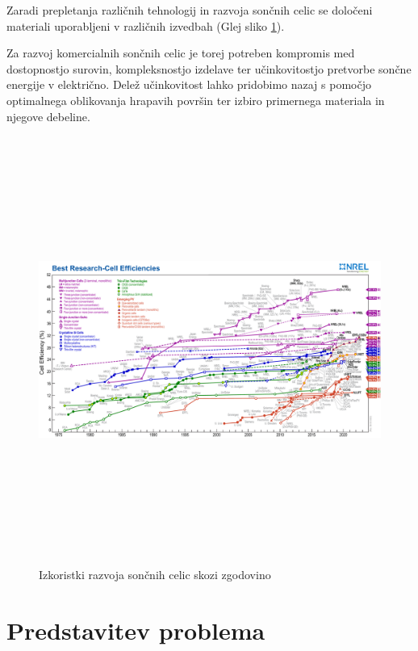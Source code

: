 \documentclass[a4paper,twoside,openright,12pt,slovene]{book}
\begin{document}
Zaradi prepletanja različnih tehnologij in razvoja sončnih celic se določeni materiali uporabljeni v različnih izvedbah (Glej sliko \ref{fig:izkoristki}).

Za razvoj komercialnih sončnih celic je torej potreben kompromis med dostopnostjo surovin, kompleksnostjo izdelave ter učinkovitostjo pretvorbe sončne energije v električno. Delež učinkovitost lahko pridobimo nazaj s pomočjo optimalnega oblikovanja hrapavih površin ter izbiro primernega materiala in njegove debeline.

\clearpage

\begin{figure}[H]
    \vspace{-4em}
    \centering
    \includegraphics[width=210mm, height=140mm, angle=90]{Slike/solar-cell-graph.pdf}
    \caption[Izkoristki razvoja sončnih celic skozi zgodovino]{Izkoristki razvoja sončnih celic skozi zgodovino \footnotemark} 
    \label{fig:izkoristki}
    \vspace{-1em}
\end{figure}


\chapter{Predstavitev problema}
\end{document}
